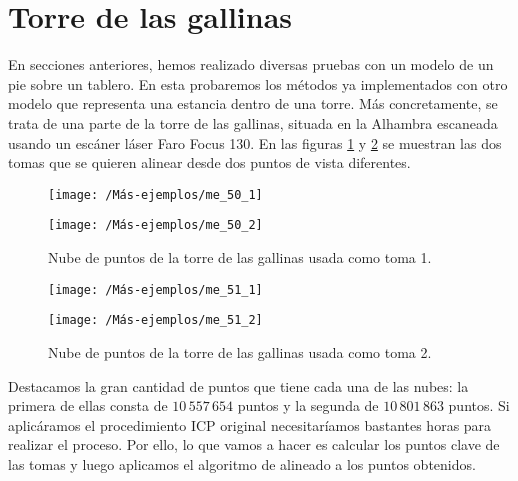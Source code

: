 \section{Torre de las gallinas}
En secciones anteriores, hemos realizado diversas pruebas con un modelo de un pie sobre un tablero. En esta probaremos los métodos ya implementados con otro modelo que representa una estancia dentro de una torre. Más concretamente, se trata de una parte de la torre de las gallinas, situada en la Alhambra escaneada usando un escáner láser Faro Focus 130. En las figuras \ref{toma1} y \ref{toma2} se muestran las dos tomas que se quieren alinear desde dos puntos de vista diferentes. \\

\begin{figure}[h!]
	\begin{minipage}[b]{0.5\textwidth}
		\centering		
		\texttt{[image: /Más-ejemplos/me\_50\_1]} 
	\end{minipage}
	\begin{minipage}[b]{0.5\textwidth}
		\centering
		\texttt{[image: /Más-ejemplos/me\_50\_2]}
	\end{minipage}
	\caption{Nube de puntos de la torre de las gallinas usada como toma 1.}
	\label{toma1}
\end{figure}

\begin{figure}[h!]
	
	\begin{minipage}[b]{0.5\textwidth}
		\centering		
		\texttt{[image: /Más-ejemplos/me\_51\_1]} 
	\end{minipage}
	\begin{minipage}[b]{0.5\textwidth}
		\centering
		\texttt{[image: /Más-ejemplos/me\_51\_2]}
	\end{minipage}
	\caption{Nube de puntos de la torre de las gallinas usada como toma 2.}
	\label{toma2}
\end{figure}

Destacamos la gran cantidad de puntos que tiene cada una de las nubes: la primera de ellas consta de $ 10\,557\,654 $ puntos y la segunda de $ 10\,801\,863 $ puntos. Si aplicáramos el procedimiento ICP original necesitaríamos bastantes horas para realizar el proceso. Por ello, lo que vamos a hacer es calcular los puntos clave de las tomas y luego aplicamos el algoritmo de alineado a los puntos obtenidos.\\

